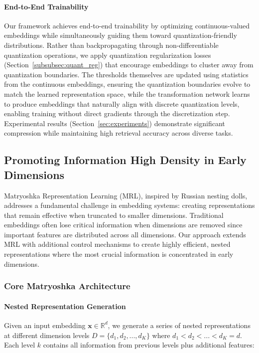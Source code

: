 \paragraph{End-to-End Trainability}
Our framework achieves end-to-end trainability by optimizing continuous-valued embeddings while simultaneously guiding them toward quantization-friendly distributions. Rather than backpropagating through non-differentiable quantization operations, we apply quantization regularization losses (Section~\ref{subsubsec:quant_reg}) that encourage embeddings to cluster away from quantization boundaries. 
The thresholds themselves are updated using statistics from the continuous embeddings, ensuring the quantization boundaries evolve to match the learned representation space, while the transformation network learns to produce embeddings that naturally align with discrete quantization levels, enabling training without direct gradients through the discretization step.
Experimental results (Section~\ref{sec:experiments}) demonstrate significant compression while maintaining high retrieval accuracy across diverse tasks.


\subsection{Promoting Information High Density in Early Dimensions}
\label{subsec:matryoshka_and_control}
Matryoshka Representation Learning (MRL), inspired by Russian nesting dolls, addresses a fundamental challenge in embedding systems: creating representations that remain effective when truncated to smaller dimensions. Traditional embeddings often lose critical information when dimensions are removed since important features are distributed across all dimensions. Our approach extends MRL with additional control mechanisms to create highly efficient, nested representations where the most crucial information is concentrated in early dimensions.

\subsubsection{Core Matryoshka Architecture}

\paragraph{Nested Representation Generation}
Given an input embedding $\mathbf{x} \in \mathbb{R}^d$, we generate a series of nested representations at different dimension levels $D = \{d_1, d_2, ..., d_K\}$ where $d_1 < d_2 < ... < d_K = d$. Each level $k$ contains all information from previous levels plus additional features:

